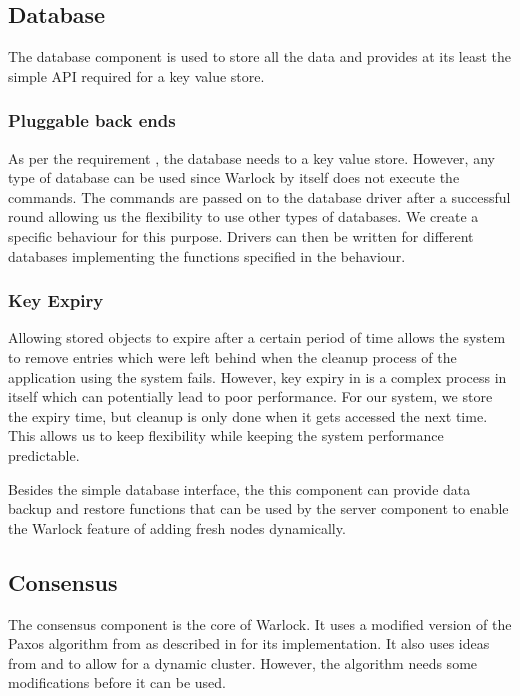 \subsection{Database}

The database component is used to store all the data and provides at its
least the simple API required for a key value store.

\subsubsection{Pluggable back ends}

As per the requirement , the database needs to a
key value store. However, any type of database can be used
since Warlock by itself does not execute the commands. The commands are passed
on to the database driver after a successful round allowing us the flexibility
to use other types of databases. We create a specific behaviour%
for this purpose. Drivers can then be written for different databases
implementing the functions specified in the behaviour.

\subsubsection{Key Expiry}
\label{section:a.n.d.expiry}

Allowing stored objects to expire after a certain period of time allows the
system to remove entries which were left behind when the cleanup process
of the application using the system fails. However, key expiry in is a
complex process in itself  which can potentially lead to
poor performance. For our system, we store the expiry time, but cleanup is
only done when it gets accessed the next time. This allows us to keep
flexibility while keeping the system performance predictable.

Besides the simple database interface, the this component can provide data
backup and restore functions that can be used by the server component to
enable the Warlock feature of adding fresh nodes dynamically.

\subsection{Consensus}

The consensus component is the core of Warlock. It uses a modified version of
the Paxos algorithm from \citet{Robbert2011} as described in
 for its implementation. It also
uses ideas from \citet{LamportSP08} and \citet{LamportMZ10} to allow for
a dynamic cluster. However, the algorithm needs some modifications
 before it can be used.

